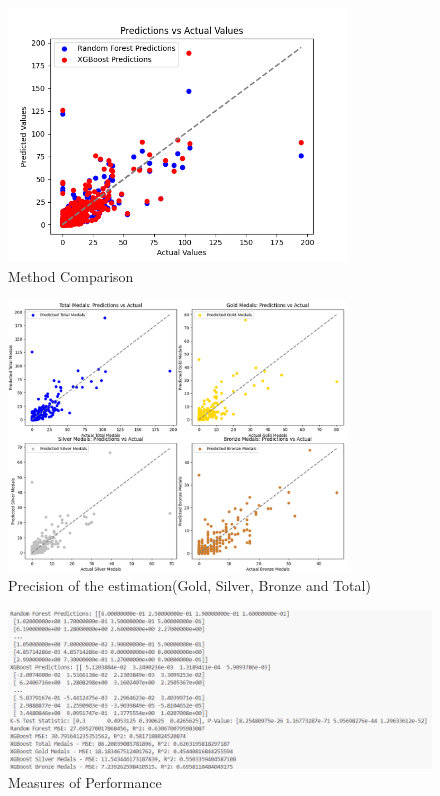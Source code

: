 \begin{figure}[htbp]
    \centering
    \includegraphics[width=0.8\textwidth]{./figures/K-S_0.png}
    \caption{Method Comparison}
    \label{fig:K-S_0}
\end{figure}

\begin{figure}[htbp]
    \centering
    \includegraphics[width=0.8\textwidth]{./figures/K-S_4.png}
    \caption{Precision of the estimation(Gold, Silver, Bronze and Total)}
    \label{fig:K-S_4}
\end{figure}

\begin{figure}[htbp]
    \centering
    \includegraphics[width=1\textwidth]{./figures/refer_KS_other.png}
    \caption{Measures of Performance}
    \label{fig:refer_KS_other}
\end{figure}

